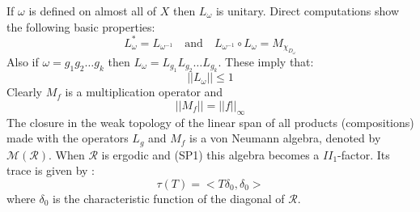 \documentclass[12pt]{amsart}
\numberwithin{equation}{section}
\begin{document}
If $\omega$ is defined on almost all of $X$ then $L_{\omega}$ is unitary.
Direct computations show the following basic properties:
\begin{equation}
L_{\omega}^*=L_{\omega^{-1}} \quad \text{and} \quad L_{{\omega}^{-1}} \circ L_{\omega}=M_{\chi_{D_{\omega}}}
\end{equation}
Also if $\omega=g_1g_2\ldots g_k$ then $L_{\omega}=L_{g_1}L_{g_2}\ldots L_{g_k}$.
These imply that:
\begin{equation}\label{normLg}
||L_{\omega}|| \leqslant 1
\end{equation}
Clearly $M_f$ is a multiplication operator and
\begin{equation}\label{normMf}
||M_f|| = ||f||_{\infty}
\end{equation}
The closure in the weak topology of the linear span of all products (compositions) made with the operators $L_{g}$ and $M_f$ is a von  Neumann algebra, denoted by $\mathcal{M }(\mathcal{R})$. When $\mathcal{R}$ is ergodic and (SP1) this algebra becomes a $II_1$-factor. Its trace is given by :
\[
\tau(T)=<T\delta_0,\delta_0>
\]
where $\delta_0$ is the characteristic function of the diagonal of $\mathcal{R}$.
\end{document}
